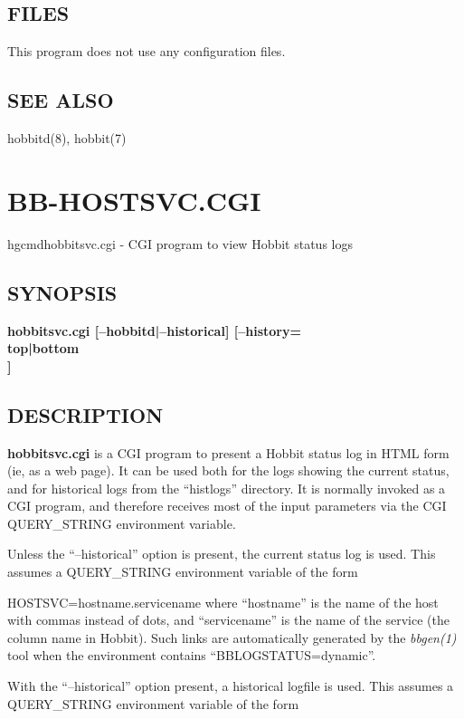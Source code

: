 \subsection{FILES}
 This program does not use any configuration files. 

 
\subsection{SEE ALSO}
hobbitd(8), hobbit(7) 

 
%
\newpage
\section{BB-HOSTSVC.CGI}

hgcmd{hobbitsvc.cgi} - CGI program to view Hobbit status logs

\subsection{SYNOPSIS}
\textbf{hobbitsvc.cgi [--hobbitd|--historical] [--history=\\{top|bottom\\}]}



\subsection{DESCRIPTION}
\textbf{hobbitsvc.cgi}
 is a CGI program to present a Hobbit status log in HTML form (ie, as a web page). It can be used both for the logs showing the current status, and for historical logs from the ``histlogs'' directory. It is normally invoked as a CGI program, and therefore receives most of the input parameters via the CGI QUERY\_STRING environment variable. 

  Unless the ``--historical'' option is present, the current status log is used. This assumes a QUERY\_STRING environment variable of the form  
 
HOSTSVC=hostname.servicename  
 where ``hostname'' is the name of the host with commas instead of dots, and ``servicename'' is the name of the service (the column name in Hobbit). Such links are automatically generated by the \emph{bbgen(1)}
 tool when the environment contains ``BBLOGSTATUS=dynamic''. 


  With the ``--historical'' option present, a historical logfile is used. This assumes a QUERY\_STRING environment variable of the form  
 

